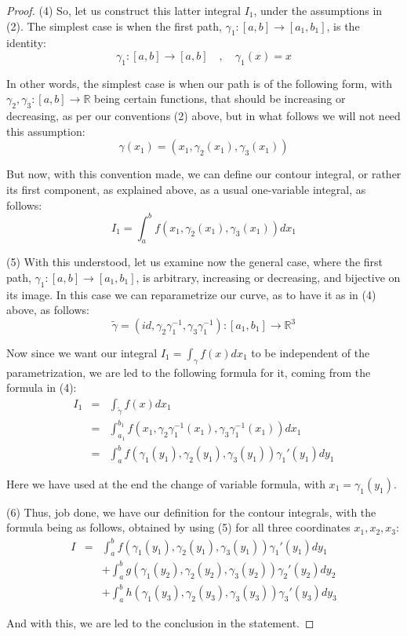 \documentclass[12pt]{amsbook}
\begin{document}
\begin{proof}
(4) So, let us construct this latter integral $I_1$, under the assumptions in (2). The simplest case is when the first path, $\gamma_1:[a,b]\to[a_1,b_1]$, is the identity:
$$\gamma_1:[a,b]\to[a,b]\quad,\quad\gamma_1(x)=x$$

In other words, the simplest case is when our path is of the following form, with $\gamma_2,\gamma_3:[a,b]\to\mathbb R$ being certain functions, that should be increasing or decreasing, as per our conventions (2) above, but in what follows we will not need this assumption:
$$\gamma(x_1)=(x_1,\gamma_2(x_1),\gamma_3(x_1))$$ 

But now, with this convention made, we can define our contour integral, or rather its first component, as explained above, as a usual one-variable integral, as follows:
$$I_1=\int_a^bf(x_1,\gamma_2(x_1),\gamma_3(x_1))dx_1$$

(5) With this understood, let us examine now the general case, where the first path, $\gamma_1:[a,b]\to[a_1,b_1]$, is arbitrary, increasing or decreasing, and bijective on its image. In this case we can reparametrize our curve, as to have it as in (4) above, as follows:
$$\tilde{\gamma}=(id,\gamma_2\gamma_1^{-1},\gamma_3\gamma_1^{-1}):[a_1,b_1]\to\mathbb R^3$$

Now since we want our integral $I_1=\int_\gamma f(x)dx_1$ to be independent of the parametrization, we are led to the following formula for it, coming from the formula in (4):
\begin{eqnarray*}
I_1
&=&\int_{\tilde{\gamma}}f(x)dx_1\\
&=&\int_{a_1}^{b_1}f(x_1,\gamma_2\gamma_1^{-1}(x_1),\gamma_3\gamma_1^{-1}(x_1))dx_1\\
&=&\int_a^bf(\gamma_1(y_1),\gamma_2(y_1),\gamma_3(y_1))\gamma_1'(y_1)dy_1
\end{eqnarray*}

Here we have used at the end the change of variable formula, with $x_1=\gamma_1(y_1)$.

\medskip

(6) Thus, job done, we have our definition for the contour integrals, with the formula being as follows, obtained by using (5) for all three coordinates $x_1,x_2,x_3$:
\begin{eqnarray*}
I
&=&\int_a^bf(\gamma_1(y_1),\gamma_2(y_1),\gamma_3(y_1))\gamma_1'(y_1)dy_1\\
&&+\int_a^bg(\gamma_1(y_2),\gamma_2(y_2),\gamma_3(y_2))\gamma_2'(y_2)dy_2\\
&&+\int_a^bh(\gamma_1(y_3),\gamma_2(y_3),\gamma_3(y_3))\gamma_3'(y_3)dy_3
\end{eqnarray*}

And with this, we are led to the conclusion in the statement.
\end{proof}
\end{document}
